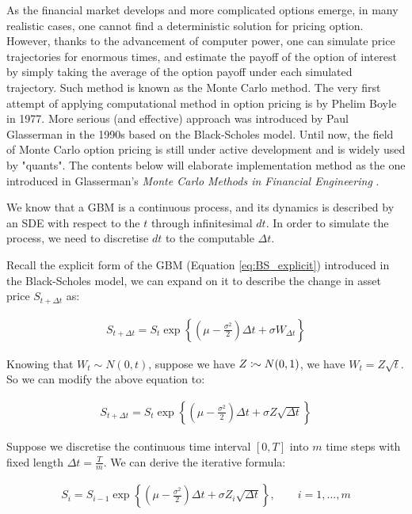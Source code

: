 As the financial market develops and more complicated options emerge, in many realistic cases, one cannot find a deterministic solution for pricing option. However, thanks to the advancement of computer power, one can simulate price trajectories for enormous times, and estimate the payoff of the option of interest by simply taking the average of the option payoff under each simulated trajectory. Such method is known as the Monte Carlo method. The very first attempt of applying computational method in option pricing is by Phelim Boyle in 1977. More serious (and effective) approach was introduced by Paul Glasserman in the 1990s based on the Black-Scholes model. Until now, the field of Monte Carlo option pricing is still under active development and is widely used by "quants". The contents below will elaborate implementation method as the one introduced in Glasserman's \textit{Monte Carlo Methods in Financial Engineering} \cite{Glasserman2003}.

We know that a GBM is a continuous process, and its dynamics is described by an SDE with respect to the $t$ through infinitesimal $dt$. In order to simulate the process, we need to discretise $dt$ to the computable $\Delta t$.

Recall the explicit form of the GBM (Equation \ref{eq:BS_explicit}) introduced in the Black-Scholes model, we can expand on it to describe the change in asset price $S_{t+\Delta t}$ as:

\begin{align*}
S_{t+\Delta t} = S_t\exp{\left\{(\mu-\frac{\sigma^2}{2})\Delta t+\sigma W_{\Delta t}\right\}}
\end{align*}

Knowing that $W_t\sim N(0,t)$, suppose we have $Z\colonsim N(0,1)$, we have $W_t=Z\sqrt{t}$. So we can modify the above equation to:

\begin{align*}
S_{t+\Delta t} = S_t\exp{\left\{(\mu-\frac{\sigma^2}{2})\Delta t+\sigma Z \sqrt{\Delta t}\right\}}
\end{align*}

Suppose we discretise the continuous time interval $[0,T]$ into $m$ time steps with fixed length $\Delta t=\frac{T}{m}$. We can derive the iterative formula:

\begin{align} \label{eq:mc_explicit}
S_{i} = S_{i-1}\exp{\left\{(\mu-\frac{\sigma^2}{2})\Delta t+\sigma Z_i \sqrt{\Delta t}\right\}},\qquad i=1,...,m
\end{align}


